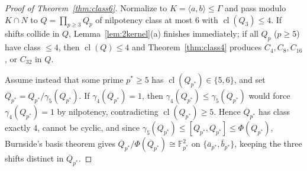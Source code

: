 \documentclass[11pt]{amsart}
\theoremstyle{definition}
\theoremstyle{remark}
\newcommand{\F}{\mathbb{F}}
\newcommand{\cl}{\operatorname{cl}}
\begin{document}
\begin{proof}[Proof of Theorem~\ref{thm:class6}]
Normalize to $K = \langle a, b \rangle \le \Gamma$ and pass modulo $K \cap N$ to $Q = \prod_{p \ge 3} Q_p$ of nilpotency class at most $6$ with $\cl(Q_3) \le 4$. If shifts collide in $Q$, Lemma~\ref{lem:2kernel}(a) finishes immediately; if all $Q_p$ ($p \ge 5$) have class $\le 4$, then $\cl(Q) \le 4$ and Theorem~\ref{thm:class4} produces $C_4, C_8, C_{16}$, or $C_{32}$ in $Q$.

Assume instead that some prime $p^* \ge 5$ has $\cl(Q_{p^*}) \in \{5, 6\}$, and set $\overline{Q}_{p^*} = Q_{p^*}/\gamma_5(Q_{p^*})$. If $\gamma_4(\overline{Q}_{p^*}) = 1$, then $\gamma_4(Q_{p^*}) \le \gamma_5(Q_{p^*})$ would force $\gamma_4(Q_{p^*}) = 1$ by nilpotency, contradicting $\cl(Q_{p^*}) \ge 5$. Hence $\overline{Q}_{p^*}$ has class exactly $4$, cannot be cyclic, and since $\gamma_5(Q_{p^*}) \le [Q_{p^*}, Q_{p^*}] \le \Phi(Q_{p^*})$, Burnside's basis theorem gives $\overline{Q}_{p^*}/\Phi(\overline{Q}_{p^*}) \cong \F_{p^*}^2$ on $\{\bar{a}_{p^*}, \bar{b}_{p^*}\}$, keeping the three shifts distinct in $\overline{Q}_{p^*}$.


\end{proof}
\end{document}
